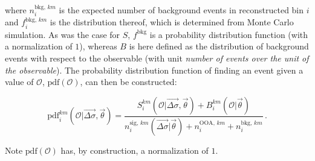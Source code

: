 % 
where $n^{\text{bkg},\,km}_i$ is the expected number of background events in reconstructed bin $i$ and $f^{\text{bkg},\,km}_i$ is the distribution thereof, which is determined from Monte Carlo simulation.
% 
As was the case for $S$, $f^\text{bkg}$ is a probability distribution function (with a normalization of $1$), whereas $B$ is here defined as the distribution of background events with respect to the observable (with unit \textit{number of events over the unit of the observable}).
% 
The probability distribution function of finding an event given a value of $\mathcal{O}$, $\text{pdf}(\mathcal{O})$, can then be constructed:
% 
\begin{linenomath*}
\begin{equation}
\text{pdf}_i^{km}(\mathcal{O} | \vec{\Delta\sigma}, \vec{\theta})
= \frac{
        S^{km}_{i}( \mathcal{O} | \vec{\Delta\sigma}, \vec{\theta})
        + B^{km}_i(\mathcal{O}|\vec{\theta})
    }{
        n_i^{\text{sig},\,km}(\vec{\Delta\sigma} | \vec{\theta})
        + n^{\text{OOA},\,km}_i
        + n^{\text{bkg},\,km}_i
    }
\,.
\end{equation}
\end{linenomath*}
% 
Note $\text{pdf}(\mathcal{O})$ has, by construction, a normalization of $1$.


